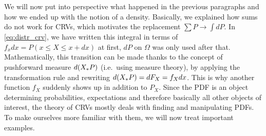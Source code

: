 We will now put into perspective what happened in the previous paragraphs and how we ended up with the notion of a density. Basically, we explained how sums do not work for CRVs, which motivates the replacement $\sum P \rightarrow \int dP$. In \eqref{eq:distr_crv}, we have written this integral in terms of $f_x dx =  P(x \leq X \leq x + dx)$ at first, $dP$ on $\Omega$ was only used after that. Mathematically, this transition can be made thanks to the concept of pushforward measure $d\qty(X_* P)$ (i.e.~using measure theory), by applying the transformation rule and rewriting $d\qty(X_* P) = dF_X = f_X dx$. This is why another function $f_X$ suddenly shows up in addition to $P_X$. Since the PDF is an object determining probabilities, expectations and therefore basically all other objects of interest, the theory of CRVs mostly deals with finding and manipulating PDFs. To make ourselves more familiar with them, we will now treat important examples. %


